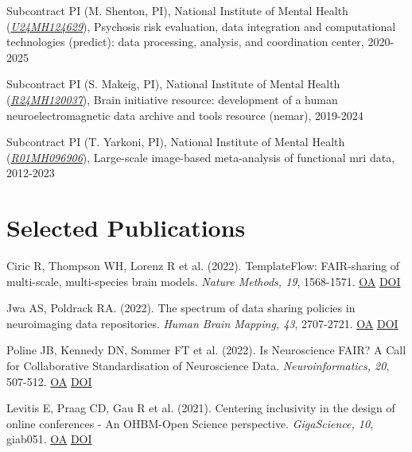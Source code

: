 \documentclass[10pt, letterpaper]{article}
\begin{document}
Subcontract PI (M. Shenton, PI), National Institute of Mental Health (\href{https://reporter.nih.gov/project-details/10092398}{\textit{U24MH124629}}), Psychosis risk evaluation, data integration and computational technologies (predict): data processing, analysis, and coordination center, 2020-2025\vspace{2mm}

Subcontract PI (S. Makeig, PI), National Institute of Mental Health (\href{http://projectreporter.nih.gov/project_info_description.cfm?aid=9795341}{\textit{R24MH120037}}), Brain initiative resource: development of a human neuroelectromagnetic data archive and tools resource (nemar), 2019-2024\vspace{2mm}

Subcontract PI (T. Yarkoni, PI), National Institute of Mental Health (\href{https://projectreporter.nih.gov/project_info_description.cfm?aid=9881347}{\textit{R01MH096906}}), Large-scale image-based meta-analysis of functional mri data, 2012-2023\vspace{2mm}


\section*{Selected Publications}
\noindent

Ciric R, Thompson WH, Lorenz R et al. (2022). TemplateFlow: FAIR-sharing of multi-scale, multi-species brain models. \textit{Nature Methods, 19}, 1568-1571. \href{https://www.ncbi.nlm.nih.gov/pmc/articles/PMC9718663}{OA} \href{https://doi.org/10.1038/s41592-022-01681-2}{DOI} \vspace{2mm}

Jwa AS, Poldrack RA.  (2022). The spectrum of data sharing policies in neuroimaging data repositories. \textit{Human Brain Mapping, 43}, 2707-2721. \href{https://www.ncbi.nlm.nih.gov/pmc/articles/PMC9057092}{OA} \href{https://doi.org/10.1002/hbm.25803}{DOI} \vspace{2mm}

Poline JB, Kennedy DN, Sommer FT et al. (2022). Is Neuroscience FAIR? A Call for Collaborative Standardisation of Neuroscience Data. \textit{Neuroinformatics, 20}, 507-512. \href{https://www.ncbi.nlm.nih.gov/pmc/articles/PMC9300762}{OA} \href{https://doi.org/10.1007/s12021-021-09557-0}{DOI} \vspace{2mm}

Levitis E, Praag CD, Gau R et al. (2021). Centering inclusivity in the design of online conferences - An OHBM-Open Science perspective. \textit{GigaScience, 10}, giab051. \href{https://www.ncbi.nlm.nih.gov/pmc/articles/PMC8377301}{OA} \href{https://doi.org/10.1093/gigascience/giab051}{DOI} \vspace{2mm}
\end{document}
